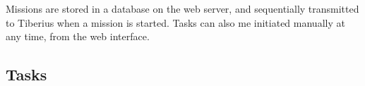 Missions are stored in a database on the web server, and sequentially transmitted to Tiberius when a mission is started. Tasks can also me initiated manually at any time, from the web interface.

\subsection{Tasks}



